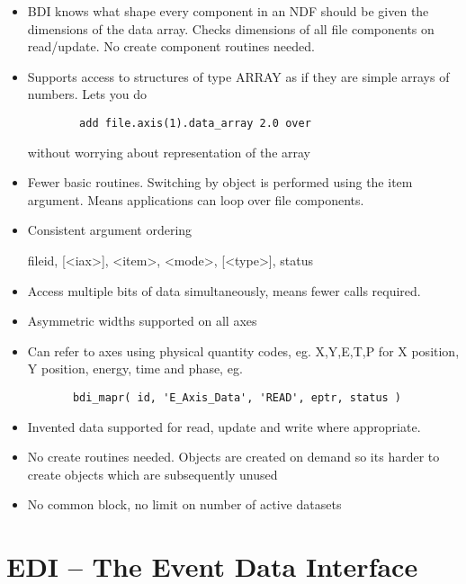 \begin{itemize}
\item  BDI knows what shape every component in an NDF should be given the
     dimensions of the data array. Checks dimensions of all file components
     on read/update. No create component routines needed.

\item  Supports access to structures of type ARRAY as if they are simple
     arrays of numbers. Lets you do 

\begin{verbatim}
        add file.axis(1).data_array 2.0 over
\end{verbatim}

     without worrying about representation of the array

\item  Fewer basic routines. Switching by object is performed using the item
     argument. Means applications can loop over file components.

\item  Consistent argument ordering

       fileid, {[<iax>], <item>}, {<mode>, [<type>]}, status

\item  Access multiple bits of data simultaneously, means fewer calls
     required.

\item  Asymmetric widths supported on all axes

\item  Can refer to axes using physical quantity codes, eg. X,Y,E,T,P for X
     position, Y position, energy, time and phase, eg.
 
\begin{verbatim}
       bdi_mapr( id, 'E_Axis_Data', 'READ', eptr, status )
\end{verbatim}
    
\item  Invented data supported for read, update and write where appropriate.

\item No create routines needed. Objects are created on demand so its harder
     to create objects which are subsequently unused

\item No common block, no limit on number of active datasets
\end{itemize}

\chapter{EDI -- The Event Data Interface}

